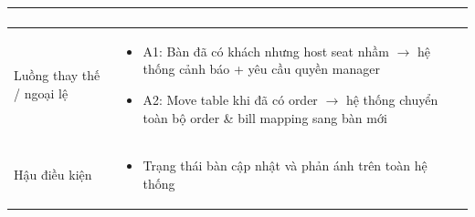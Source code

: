 \begin{longtable}{|>{\raggedright\arraybackslash}p{}|>{\raggedright\arraybackslash}p{}|}
\begin{enumerate}[leftmargin=*]
\end{enumerate}
\vspace{-0.5em}
\\
\hline
Luồng thay thế / ngoại lệ &
\vspace{-0.5em}
\begin{itemize}[leftmargin=*]
\item A1: Bàn đã có khách nhưng host seat nhầm $\rightarrow$ hệ thống cảnh báo + yêu cầu quyền manager
\item A2: Move table khi đã có order $\rightarrow$ hệ thống chuyển toàn bộ order \& bill mapping sang bàn mới
\end{itemize}
\vspace{-0.5em}
\\
\hline
Hậu điều kiện &
\vspace{-0.5em}
\begin{itemize}[leftmargin=*]
\item Trạng thái bàn cập nhật và phản ánh trên toàn hệ thống
\end{itemize}
\vspace{-0.5em}
\\
\hline
\end{longtable}

